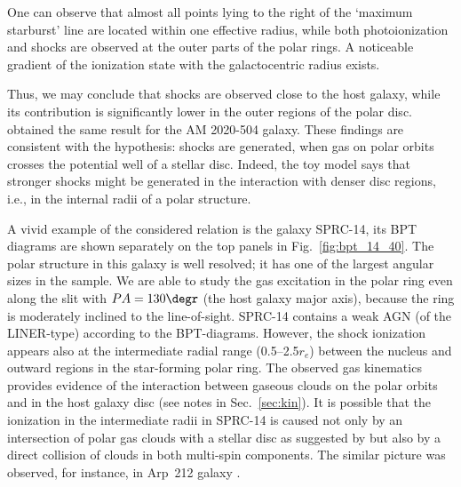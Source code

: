\documentclass[useAMS,usenatbib]{mnras}
\begin{document}
One can observe that almost all points lying to the right of the `maximum starburst' line are located within one effective radius, while both photoionization and shocks are  observed at the outer parts of the polar rings. A noticeable gradient of the ionization state with the galactocentric radius  exists. 

Thus, we may conclude that shocks are observed close to the host galaxy, while its contribution is significantly lower in the outer regions of the polar disc. \cite{Freitas2012} obtained the same result for the AM 2020-504 galaxy. These findings are consistent with the \citet{Wakamatsu1993} hypothesis: shocks are generated, when gas on polar orbits crosses the potential well of a stellar disc. Indeed, the \citet{Wakamatsu1993} toy model says that stronger shocks might be generated in the interaction with denser disc regions, i.e., in the internal radii of a polar structure.  

A vivid example of the considered relation is the galaxy SPRC-14, its BPT diagrams are shown separately on the top panels in Fig.~\ref{fig:bpt_14_40}. The polar structure in this galaxy is well resolved; it has one of the largest angular sizes in the sample. We are able to study the gas excitation in the polar ring even along the slit with $PA=130\degr$ (the host galaxy major axis), because the ring is moderately inclined to the line-of-sight.  SPRC-14 contains a weak AGN  (of the LINER-type)  according to the BPT-diagrams. However, the shock ionization appears also at the intermediate  radial range (0.5--2.5$r_e$) between the nucleus and  outward regions in the star-forming polar ring. The observed gas kinematics provides evidence of the interaction between gaseous clouds on the polar orbits and in the host galaxy disc (see notes in Sec.~\ref{sec:kin}). It is possible that the ionization in the intermediate radii in SPRC-14 is caused not only by an intersection of polar gas clouds with a stellar disc as suggested by \citet{Wakamatsu1993} but also by a direct collision of clouds in both multi-spin components. The similar picture was observed, for instance, in Arp~212 galaxy \citep{Moiseev2008arp212}.   
\end{document}
